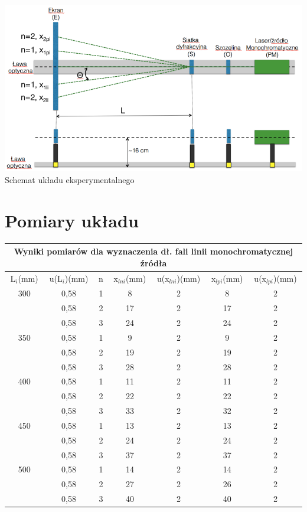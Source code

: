 \documentclass[12pt]{article}
\begin{document}
\includegraphics[scale = 0.63]{schemat.png} \\
Schemat układu eksperymentalnego

\section{Pomiary układu}

\begin{table}[!htbp]
    \centering
    \begin{adjustbox}{width=1\textwidth}
    \begin{tabular}{|c|c|c|c|c|c|c|}
    \hline
    \multicolumn{7}{|c|}{Wyniki pomiarów dla wyznaczenia dł. fali linii monochromatycznej źródła} \\
    \hline
        L$_i$(mm) & u(L$_i$)(mm) & n & x$_{lni}$(mm) & u(x$_{lni}$)(mm) & x$_{lpi}$(mm) & u(x$_{lpi}$)(mm) \\ \hline
        300 & 0,58 & 1 & 8 & 2 & 8 & 2 \\
        ~ & 0,58 & 2 & 17 & 2 & 17 & 2 \\ 
        ~ & 0,58 & 3 & 24 & 2 & 24 & 2 \\ \hline
        350 & 0,58 & 1 & 9 & 2 & 9 & 2 \\
        ~ & 0,58 & 2 & 19 & 2 & 19 & 2 \\ 
        ~ & 0,58 & 3 & 28 & 2 & 28 & 2 \\ \hline
        400 & 0,58 & 1 & 11 & 2 & 11 & 2 \\ 
        ~ & 0,58 & 2 & 22 & 2 & 22 & 2 \\ 
        ~ & 0,58 & 3 & 33 & 2 & 32 & 2 \\ \hline
        450 & 0,58 & 1 & 13 & 2 & 13 & 2 \\ 
        ~ & 0,58 & 2 & 24 & 2 & 24 & 2 \\ 
        ~ & 0,58 & 3 & 37 & 2 & 37 & 2 \\ \hline
        500 & 0,58 & 1 & 14 & 2 & 14 & 2 \\ 
        ~ & 0,58 & 2 & 27 & 2 & 26 & 2 \\ 
        ~ & 0,58 & 3 & 40 & 2 & 40 & 2 \\ \hline
    \end{tabular}
\end{adjustbox}
\end{table}
\end{document}
